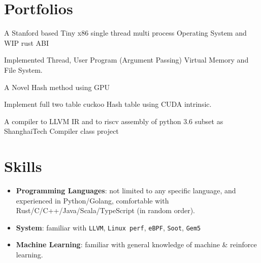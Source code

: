 \documentclass{resume}
\newcommand{\en}[1]{#1}
\newcommand{\zh}[1]{}
\begin{document}
\section{\en{Portfolios}\zh{团队项目}}
\en{A Stanford based Tiny x86 single thread multi process Operating System and WIP rust ABI}
\zh{一个玩具x86单核多线程操作系统，同时在写rust ABI层。}
\small{ \en{Implemented Thread, User Program (Argument Passing) Virtual Memory and File System.}\zh{实现了线程，Syscall和虚拟内存以及文件系统。}}

\en{A Novel Hash method using GPU}
\zh{一个在GPU上新颖的hash方法}
\small{ \en{Implement full two table cuckoo Hash table using CUDA intrinsic.}\zh{实现了双表杜鹃鸟表，这在数据降维等方面很有用处。}}

\en{A compiler to LLVM IR and to riscv assembly of python 3.6 subset as ShanghaiTech Compiler class project}
\zh{一个从 python3.6 子集编译至 LLVM IR 和 riscv 汇编的编译器，作为编译原理课的 project}

\section{\en{Skills}\zh{技能}}
\begin{itemize}[parsep=0.25ex]
      \item \en{\textbf{Programming Languages}:
                  not limited to any specific language,
                  and experienced in Python/Golang,
                  comfortable with Rust/C/C++/Java/Scala/TypeScript (in random order).}
            \zh{\textbf{编程语言}:
                  不局限于特定编程语言，且尤其熟悉 Python/Golang 等，
                  了解 Rust/C/C++/Java/Scala/TypeScript 等。}

      \item \en{\textbf{System}:
                  familiar with \texttt{LLVM}, \texttt{Linux perf}, \texttt{eBPF}, \texttt{Soot}, \texttt{Gem5}}
            \zh{\textbf{系统}:
                  熟悉各种操作系统内核的概念与设计，熟悉各种内核性能调优工具，例如\texttt{LLVM}, \texttt{Linux perf}, \texttt{eBPF}, \texttt{Soot}, \texttt{Gem5}。}

      \item \en{\textbf{Machine Learning}:
                  familiar with general knowledge of machine \& reinforce learning.}
            \zh{\textbf{机器学习}:
                  熟悉经典机器与强化学习算法。}
\end{itemize}
\end{document}
